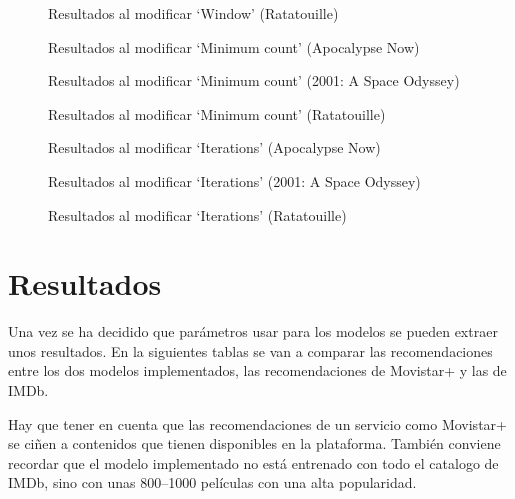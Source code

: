 \documentclass[withindex, glossary]{cam-thesis}
\begin{document}
\begin{figure}[!htbp]
    \centering
    
    \caption{Resultados al modificar `Window' (Ratatouille)}
\end{figure}

\begin{figure}[!htbp]
    \centering
    
    \caption{Resultados al modificar `Minimum count' (Apocalypse Now)}
\end{figure}

\begin{figure}[!htbp]
    \centering
    
    \caption{Resultados al modificar `Minimum count' (2001: A Space Odyssey)}
\end{figure}

\begin{figure}[!htbp]
    \centering
    
    \caption{Resultados al modificar `Minimum count' (Ratatouille)}
\end{figure}

\begin{figure}[!htbp]
    \centering
    
    \caption{Resultados al modificar `Iterations' (Apocalypse Now)}
\end{figure}

\begin{figure}[!htbp]
    \centering
    
    \caption{Resultados al modificar `Iterations' (2001: A Space Odyssey)}
\end{figure}

\begin{figure}[!htbp]
    \centering
    
    \caption{Resultados al modificar `Iterations' (Ratatouille)}
\end{figure}

\chapter{Resultados}
Una vez se ha decidido que parámetros usar para los modelos se pueden extraer unos resultados. En la siguientes tablas se van a comparar las recomendaciones entre los dos modelos implementados, las recomendaciones de Movistar+ y las de IMDb.

Hay que tener en cuenta que las recomendaciones de un servicio como Movistar+ se ciñen a contenidos que tienen disponibles en la plataforma. También conviene recordar que el modelo implementado no está entrenado con todo el catalogo de IMDb, sino con unas 800--1000 películas con una alta popularidad.
\end{document}
